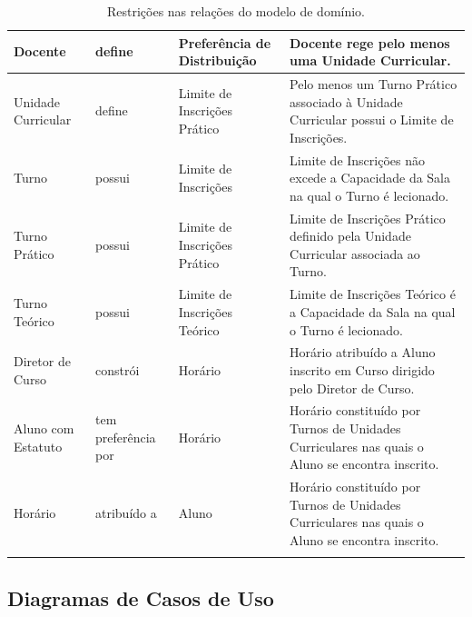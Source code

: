 \documentclass[12pt, a4paper]{article}
\makeatletter
\renewcommand\section[1]{
    \newpage
    \thispagestyle{empty}
    \vspace*{\fill}
    \@startsection{section}{1}{\z@}{0px}{50px}{\normalfont\Huge\bfseries}{#1}
    \vspace*{\fill}
    \newpage
}
\makeatother
\begin{document}
\begin{longtable}{|>{\centering}m{2.5cm}
                  |>{\centering}m{2.5cm}
                  |>{\centering}m{2.5cm}
                  |m{8cm}|}
    \hline
    Docente                     &
    define                      &
    Preferência de Distribuição &
    Docente rege pelo menos uma Unidade Curricular. \\

    \hline
    Unidade Curricular           &
    define                       &
    Limite de Inscrições Prático &
    Pelo menos um Turno Prático associado à Unidade Curricular possui o Limite de Inscrições. \\

    \hline
    \newpage
    Turno                &
    possui               &
    Limite de Inscrições &
    Limite de Inscrições não excede a Capacidade da Sala na qual o Turno é lecionado. \\

    \hline
    Turno Prático                &
    possui                       &
    Limite de Inscrições Prático &
    Limite de Inscrições Prático definido pela Unidade Curricular associada ao Turno. \\

    \hline
    Turno Teórico                &
    possui                       &
    Limite de Inscrições Teórico &
    Limite de Inscrições Teórico é a Capacidade da Sala na qual o Turno é lecionado. \\

    \hline
    Diretor de Curso &
    constrói         &
    Horário          &
    Horário atribuído a Aluno inscrito em Curso dirigido pelo Diretor de Curso. \\

    \hline
    Aluno com Estatuto  &
    tem preferência por &
    Horário             &
    Horário constituído por Turnos de Unidades Curriculares nas quais o Aluno se encontra
    inscrito. \\

    \hline
    Horário     &
    atribuído a &
    Aluno       &
    Horário constituído por Turnos de Unidades Curriculares nas quais o Aluno se encontra
    inscrito. \\

    \hline
    \caption{Restrições nas relações do modelo de domínio.}
\end{longtable}

\section{Casos de Uso}

\subsection{Diagramas de Casos de Uso}
\end{document}
